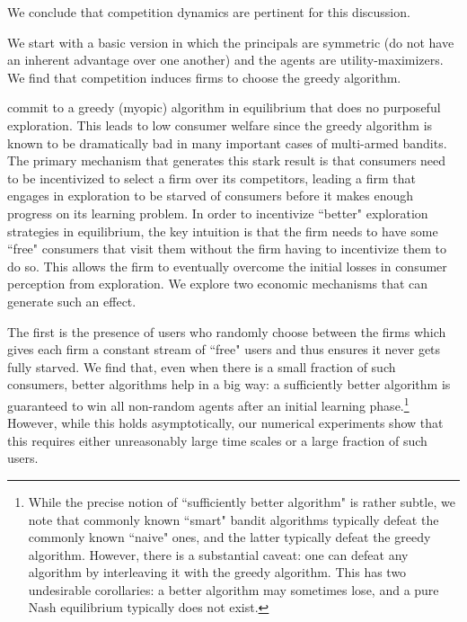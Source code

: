 \noindent We conclude that competition dynamics are pertinent for this discussion.



\newpage
{}

We start with a basic version in which the principals are symmetric (\ie do not have an inherent advantage over one another) and the agents are utility-maximizers. We find that competition induces firms to choose the greedy algorithm.

commit to a greedy (myopic) algorithm in equilibrium that does no purposeful exploration. This leads to low consumer welfare since the greedy algorithm is known to be dramatically bad in many important cases of multi-armed bandits. The primary mechanism that generates this stark result is that consumers need to be incentivized to select a firm over its competitors, leading a firm that engages in exploration to be starved of consumers before it makes enough progress on its learning problem. In order to incentivize ``better" exploration strategies in equilibrium, the key intuition is that the firm needs to have some ``free" consumers that visit them without the firm having to incentivize them to do so. This allows the firm to eventually overcome the initial losses in consumer perception from exploration. We explore two economic mechanisms that can generate such an effect.

The first is the presence of users who randomly choose between the firms which gives each firm a constant stream of ``free" users and thus ensures it never gets fully starved. We find that, even when there is a small fraction of such consumers, better algorithms help in a big way: a sufficiently better algorithm is guaranteed to win all non-random agents after an initial learning phase.\footnote{While the precise notion of ``sufficiently better algorithm" is rather subtle, we note that commonly known ``smart" bandit algorithms typically defeat the commonly known ``naive" ones, and the latter typically defeat the greedy algorithm. However, there is a substantial caveat: one can defeat any algorithm by interleaving it with the greedy algorithm. This has two undesirable corollaries: a better algorithm may sometimes lose, and a pure Nash equilibrium typically does not exist.} However, while this holds asymptotically, our numerical experiments show that this requires either unreasonably large time scales or a large fraction of such users.

